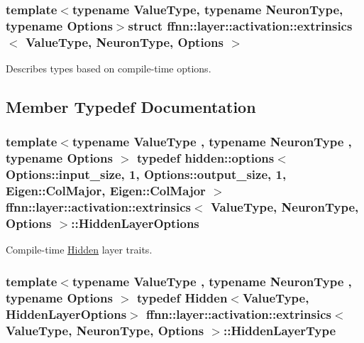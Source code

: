\subsubsection*{template$<$typename Value\-Type, typename Neuron\-Type, typename Options$>$struct ffnn\-::layer\-::activation\-::extrinsics$<$ Value\-Type, Neuron\-Type, Options $>$}

Describes types based on compile-\/time options. 

\subsection{Member Typedef Documentation}
\hypertarget{structffnn_1_1layer_1_1activation_1_1extrinsics_a879a4e29c3e7ff05ccc1d8a967230bb5}{
\subsubsection[{Hidden\-Layer\-Options}]{\setlength{\rightskip}{0pt plus 5cm}template$<$typename Value\-Type , typename Neuron\-Type , typename Options $>$ typedef {\bf hidden\-::options}$<$ Options\-::input\-\_\-size, 1, Options\-::output\-\_\-size, 1, Eigen\-::\-Col\-Major, Eigen\-::\-Col\-Major $>$ {\bf ffnn\-::layer\-::activation\-::extrinsics}$<$ Value\-Type, Neuron\-Type, Options $>$\-::{\bf Hidden\-Layer\-Options}}}\label{structffnn_1_1layer_1_1activation_1_1extrinsics_a879a4e29c3e7ff05ccc1d8a967230bb5}


Compile-\/time \hyperlink{classffnn_1_1layer_1_1_hidden}{Hidden} layer traits. 

\hypertarget{structffnn_1_1layer_1_1activation_1_1extrinsics_abdfd375dd1e57312be2298b48ab00851}{
\subsubsection[{Hidden\-Layer\-Type}]{\setlength{\rightskip}{0pt plus 5cm}template$<$typename Value\-Type , typename Neuron\-Type , typename Options $>$ typedef {\bf Hidden}$<$Value\-Type, {\bf Hidden\-Layer\-Options}$>$ {\bf ffnn\-::layer\-::activation\-::extrinsics}$<$ Value\-Type, Neuron\-Type, Options $>$\-::{\bf Hidden\-Layer\-Type}}}\label{structffnn_1_1layer_1_1activation_1_1extrinsics_abdfd375dd1e57312be2298b48ab00851}


